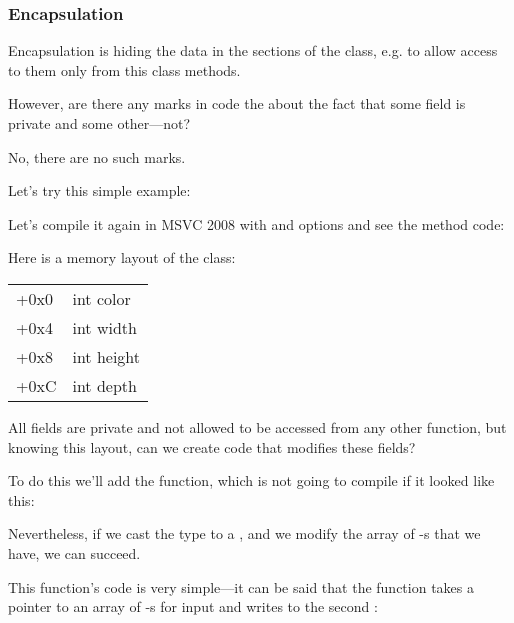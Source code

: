 \subsubsection{Encapsulation}

Encapsulation is hiding the data in the  sections of the class, 
e.g. to allow access to them only from this class methods.

However, are there any marks in code the about the fact that some field is private and
some other---not?

No, there are no such marks.

Let's try this simple example:



Let's compile it again in MSVC 2008 with \Ox and \Obzero options and see the  method code:



Here is a memory layout of the class:

\begin{center}
\begin{tabular}{ | l | l | }
\hline
  \tableheader{} \\
\hline
  +0x0 & int color \\
\hline
  +0x4 & int width \\
\hline
  +0x8 & int height \\
\hline
  +0xC & int depth \\
\hline
\end{tabular}
\end{center}

All fields are private and not allowed to be accessed from any other
function, but knowing this layout, can we create code that modifies these fields? 

To do this we'll add the  function, 
which is not going to compile if it looked like this:



Nevertheless, if we cast the  type to a ,
and we modify the array of \Tint{}-s that we have, we can succeed.



This function's code is very simple---it can be said that the function takes a pointer to an array of \Tint{}-s for input
and writes  to the second \Tint{}:

